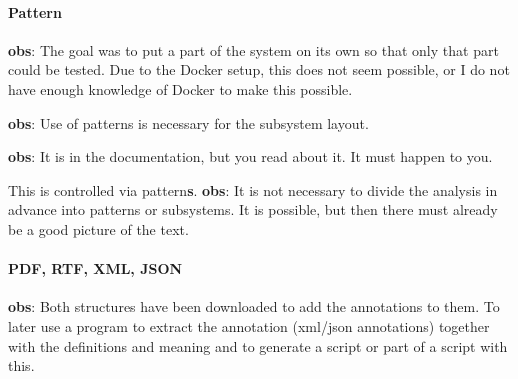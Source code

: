 \paragraph{Pattern}
\begin{obs}\label{obs:rq1-49:30-10}
    \textbf{obs}: The goal was to put a part of the system on its own so that only that part could be tested.
    Due to the Docker setup, this does not seem possible, or I do not have enough knowledge of Docker to make this possible.
\end{obs}

\begin{obs}\label{obs:rq1-33:14-9}
    \textbf{obs}: Use of patterns is necessary for the subsystem layout.
\end{obs}

\begin{obs}\label{obs:rq1-34:14-9}
    \textbf{obs}: It is in the documentation, but you read about it.
    It must happen to you.
\end{obs}

\begin{obs}\label{obs:rq1-38:3-10}
    This is controlled via {pattern}\textbf{s}.
    \textbf{obs}: It is not necessary to divide the analysis in advance into patterns or subsystems.
    It is possible, but then there must already be a good picture of the text.
\end{obs}

\paragraph{PDF, RTF, XML, JSON}
\begin{obs}\label{obs:rq1-24:12-9}
    \textbf{obs}: Both structures have been downloaded to add the annotations to them.
    To later use a program to extract the annotation (xml/json annotations) together with the definitions and meaning and to generate a script or part of a script with this.
\end{obs}

